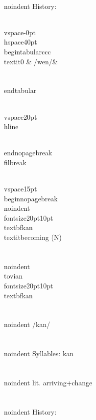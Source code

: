 \\noindent History:

\\vspace{-0pt}
\\hspace{40pt}
\\begin{tabular}{ccc}
\\textit{0} & /wen/& \\\\
\\end{tabular}

\\vspace{20pt}\\hline

\\end{nopagebreak}
\\filbreak



\\vspace{15pt}
\\begin{nopagebreak}
\\noindent{\\fontsize{20pt}{10pt}\\textbf{kan} } \\textit{becoming} (N)\\\\
\\noindent {\\tovian \\fontsize{20pt}{10pt} \\textbf{kan} }\\\\
\\noindent /k{\textprimstress}an/\\\\
\\noindent Syllables: kan\\\\
\\noindent lit. arriving+change\\\\


\\noindent History:

